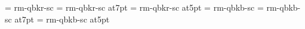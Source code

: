 \def\twelvecaps{\font\fzzozznzzt=   rm-qbkr-sc at12pt \fzzozznzzt}%
\font\caps=            rm-qbkr-sc
\def\ninecaps{\font\fzzozznzzt=        rm-qbkr-sc at9pt \fzzozznzzt}%
\def\eightcaps{\font\fzzozznzzt=       rm-qbkr-sc at8pt \fzzozznzzt}%
\font\sevencaps=       rm-qbkr-sc at7pt
\def\sixcaps{\font\fzzozznzzt=         rm-qbkr-sc at6pt \fzzozznzzt}%
\font\fivecaps=        rm-qbkr-sc at5pt
%
\def\twentycapsbf{\font\fzzozznzzt=   rm-qbkb-sc at20pt \fzzozznzzt}%
\def\eighteencapsbf{\font\fzzozznzzt= rm-qbkb-sc at18pt \fzzozznzzt}%
\def\sixteencapsbf{\font\fzzozznzzt=  rm-qbkb-sc at16pt \fzzozznzzt}%
\def\fourteencapsbf{\font\fzzozznzzt=    rm-qbkb-sc at14pt \fzzozznzzt}%
\def\twelvecapsbf{\font\fzzozznzzt=   rm-qbkb-sc at12pt \fzzozznzzt}%
\font\capsbf=            rm-qbkb-sc
\def\ninecapsbf{\font\fzzozznzzt=        rm-qbkb-sc at9pt \fzzozznzzt}%
\def\eightcapsbf{\font\fzzozznzzt=       rm-qbkb-sc at8pt \fzzozznzzt}%
\font\sevencapsbf=       rm-qbkb-sc at7pt
\def\sixcapsbf{\font\fzzozznzzt=         rm-qbkb-sc at6pt \fzzozznzzt}%
\font\fivecapsbf=        rm-qbkb-sc at5pt
%
\rm